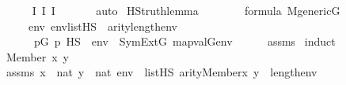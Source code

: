 \begin{isabellebody}
\ \ \ \ \isamarkupfalse%
\ I{}\ I{}\ I{}\ \isanewline
\ \ \ \ \isamarkupfalse%
\ auto\isanewline
{}\isamarkupfalse%
%
\endisatagproof
{\isafoldproof}%
%
\isadelimproof
\isanewline
%
\endisadelimproof
\isanewline
{}\isamarkupfalse%
\ HS{\isacharunderscore}{\kern0pt}truth{\isacharunderscore}{\kern0pt}lemma{\isacharcolon}{\kern0pt}\isanewline
\ \ \ \isanewline
\ \ \ \ {\isachardoublequoteopen}{\isasymphi}{\isasymin}formula{\isachardoublequoteclose}\ {\isachardoublequoteopen}M{\isacharunderscore}{\kern0pt}generic{\isacharparenleft}{\kern0pt}G{\isacharparenright}{\kern0pt}{\isachardoublequoteclose}\isanewline
\ \ \ \isanewline
\ \ \ \ \ {\isachardoublequoteopen}{\isasymAnd}env{\isachardot}{\kern0pt}\ env{\isasymin}list{\isacharparenleft}{\kern0pt}HS{\isacharparenright}{\kern0pt}\ {\isasymLongrightarrow}\ arity{\isacharparenleft}{\kern0pt}{\isasymphi}{\isacharparenright}{\kern0pt}{\isasymle}length{\isacharparenleft}{\kern0pt}env{\isacharparenright}{\kern0pt}\ {\isasymLongrightarrow}\ \isanewline
\ \ \ \ \ \ {\isacharparenleft}{\kern0pt}{\isasymexists}p{\isasymin}G{\isachardot}{\kern0pt}\ p\ {\isasymtturnstile}HS\ {\isasymphi}\ env{\isacharparenright}{\kern0pt}\ {\isasymlongleftrightarrow}\ SymExt{\isacharparenleft}{\kern0pt}G{\isacharparenright}{\kern0pt}{\isacharcomma}{\kern0pt}\ map{\isacharparenleft}{\kern0pt}val{\isacharparenleft}{\kern0pt}G{\isacharparenright}{\kern0pt}{\isacharcomma}{\kern0pt}env{\isacharparenright}{\kern0pt}\ {\isasymTurnstile}\ {\isasymphi}{\isachardoublequoteclose}\isanewline
%
\isadelimproof
\ \ %
\endisadelimproof
%
\isatagproof
{}\isamarkupfalse%
\ assms{\isacharparenleft}{\kern0pt}{}{\isacharparenright}{\kern0pt}\isanewline
{}\isamarkupfalse%
\ {\isacharparenleft}{\kern0pt}induct{\isacharparenright}{\kern0pt}\isanewline
\ \ \isamarkupfalse%
\ {\isacharparenleft}{\kern0pt}Member\ x\ y{\isacharparenright}{\kern0pt}\isanewline
\ \ \isamarkupfalse%
\ \isamarkupfalse%
\ assms{}{\isacharcolon}{\kern0pt}\ {\isachardoublequoteopen}x\ {\isasymin}\ nat{\isachardoublequoteclose}\ {\isachardoublequoteopen}y\ {\isasymin}\ nat{\isachardoublequoteclose}\ {\isachardoublequoteopen}env\ {\isasymin}\ list{\isacharparenleft}{\kern0pt}HS{\isacharparenright}{\kern0pt}{\isachardoublequoteclose}\ {\isachardoublequoteopen}arity{\isacharparenleft}{\kern0pt}Member{\isacharparenleft}{\kern0pt}x{\isacharcomma}{\kern0pt}\ y{\isacharparenright}{\kern0pt}{\isacharparenright}{\kern0pt}\ {\isasymle}\ length{\isacharparenleft}{\kern0pt}env{\isacharparenright}{\kern0pt}{\isachardoublequoteclose}\ \isamarkupfalse%

\end{isabellebody}
